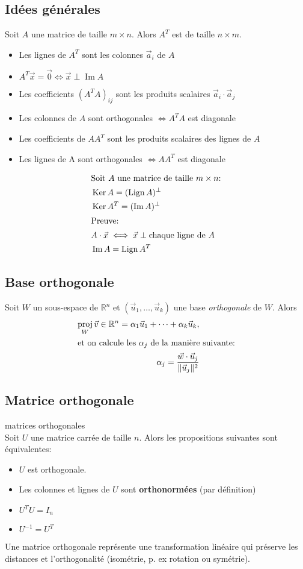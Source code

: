 \documentclass{article}
\numberwithin{equation}{section}
\newcommand\thm[1]{\vspace{4px}\noindent \quad {\large \underline{\textsc{Théorème #1}}: }}
\providecommand{\norm}[1]{\lVert#1\rVert}
\DeclareMathOperator{\im}{Im}
\DeclareMathOperator{\ke}{Ker}
\DeclareMathOperator{\lign}{Lign}
\DeclareMathOperator{\proj}{proj}
\begin{document}
\subsection{Idées générales}

Soit $A$ une matrice de taille $m \times n$. Alors $A^T$ est de taille $n \times m$.
\begin{itemize}
	\item Les lignes de $A^T$ sont les colonnes $\vec a_i$ de $A$
	\item $A^T\vec x = \vec 0 \iff \vec x \perp \im A$
	\item Les coefficients $(A^TA)_{ij}$ sont les produits scalaires $\vec a_i \cdot \vec a_j$
	\item Les colonnes de $A$ sont orthogonales $\iff A^TA$ est diagonale
	\item Les coefficients de $AA^T$ sont les produits scalaires des lignes de $A$
	\item Les lignes de A sont orthogonales $\iff AA^T$ est diagonale
\end{itemize}

\begin{align}
\shortintertext{Soit \(A\) une matrice de taille \(m \times n\):}
	&\ke A = (\lign A)^\perp \\
	&\ke A^T = 	(\im A)^\perp \\
\shortintertext{Preuve:}
	\nonumber &A \cdot \vec x \iff \vec x \perp \text{chaque ligne de } A \\
	\nonumber &\im A = \lign A^T
\end{align}

\subsection{Base orthogonale}
Soit \(W\) un sous-espace de \(\mathbb{R}^n\) et \((\vec u_1, \dots, \vec u_k)\) une base \emph{orthogonale} de \(W\). Alors
\begin{align}
	\proj_W \vec v \in \mathbb{R}^n = \alpha_1\vec u_1 + \dots + \alpha_k\vec u_k, \\
\intertext{et on calcule les $\alpha_j$ de la manière suivante:}
	\label{eq:orthoproj} \alpha_j = \dfrac{\vec w \cdot \vec u_j}{\norm{\vec u_j}^2}
\end{align}

\subsection{Matrice orthogonale}
\thm{} matrices orthogonales \\
Soit $U$ une matrice carrée de taille $n$. Alors les propositions suivantes sont équivalentes:
\begin{itemize}
	\item $U$ est orthogonale.
	\item Les colonnes et lignes de $U$ sont \textbf{orthonormées} (par définition)
	\item $U^TU = I_n$
	\item $U^{-1} = U^T$
\end{itemize}
Une matrice orthogonale représente une transformation linéaire qui préserve les distances et l'orthogonalité (isométrie, p. ex rotation ou symétrie). \\
\end{document}
